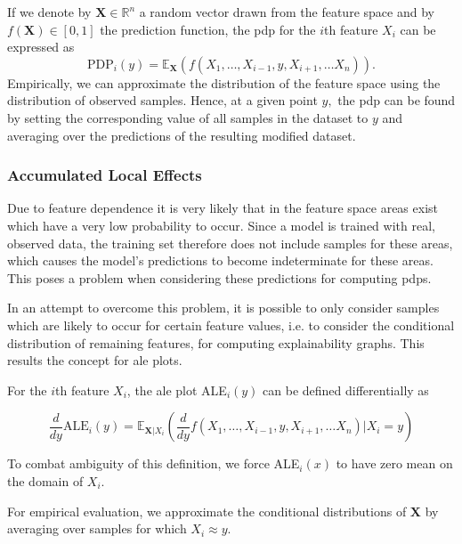 \documentclass[10pt,sigconf,letterpaper,dvipsnames]{acmart}
\newcommand\note[2]{{\color{#1}#2}}
\newcommand\todo[1]{{\note{red}{TODO: #1}}}
\begin{document}
If we denote by $\boldsymbol X \in \mathbb R ^n$ a random vector drawn from the feature space and by $f(\boldsymbol X) \in [0,1]$ the  prediction function, the \gls{pdp} for the $i$th feature $X_i$ can be expressed as
\begin{equation}
\text{PDP}_i(y) = \mathbb E_{\boldsymbol X}\left(f(X_1,\ldots,X_{i-1},y,X_{i+1},\ldots X_n)\right) . %
\end{equation}
Empirically, we can approximate the distribution of the feature space using the distribution of observed samples. Hence, at a given point $y,$ the \gls{pdp} can be found by setting the corresponding value of all samples in the dataset to $y$ and averaging over the predictions of the resulting modified dataset.

\subsubsection{Accumulated Local Effects}
Due to feature dependence it is very likely that in the feature space areas exist which have a very low probability to occur. Since a model is trained with real, observed data, the training set therefore does not include samples for these areas, which causes the model's predictions to become indeterminate for these areas. This poses a problem when considering these predictions for computing \glspl{pdp}.

In an attempt to overcome this problem, it is possible to only consider samples which are likely to occur for certain feature values, i.e. to consider the conditional distribution of remaining features, for computing explainability graphs. This results the concept for \gls{ale} plots.

For the $i$th feature $X_i$, the \gls{ale} plot ALE$_i(y)$ can be defined differentially as



\begin{equation}
\frac{d}{dy} \text{ALE}_i (y) = \mathbb E_{\boldsymbol X | X_i}\left(\frac{d}{dy} f(X_1,\ldots,X_{i-1},y,X_{i+1},\ldots X_n) | X_i=y\right)
\end{equation}

To combat ambiguity of this definition, we force ALE$_i(x)$ to have zero mean on the domain of $X_i$.

For empirical evaluation, we approximate the conditional distributions of $\boldsymbol X$ by averaging over samples for which $X_i \approx y$.
\end{document}

